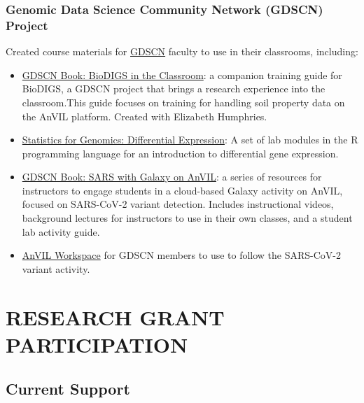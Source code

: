 \documentclass{cv}
\begin{document}
\subsubsection*{Genomic Data Science Community Network (GDSCN) Project}

Created course materials for \href{https://www.gdscn.org/}{GDSCN} faculty to use in their classrooms, including: 

\begin{itemize}

\item \href{https://hutchdatascience.org/GDSCN_BioDIGS_Book/}{GDSCN Book: BioDIGS in the Classroom}: a companion training guide for BioDIGS, a GDSCN project that brings a research experience into the classroom.This guide focuses on training for handling soil property data on the AnVIL platform. Created with Elizabeth Humphries.

\item \href{https://jhudatascience.org/GDSCN_Book_Statistics_for_Genomics_Differential_Expression/}{Statistics for Genomics: Differential Expression}: A set of lab modules in the R programming language for an introduction to differential gene expression.

\item \href{https://jhudatascience.org/GDSCN_Book_SARS_Galaxy_on_AnVIL/}{GDSCN Book: SARS with Galaxy on AnVIL}: a series of resources for instructors to engage students in a cloud-based Galaxy activity on AnVIL, focused on SARS-CoV-2 variant detection. Includes instructional videos, background lectures for instructors to use in their own classes, and a student lab activity guide.

\item \href{https://anvil.terra.bio/#workspaces/gdscn-exercises/SARS-CoV-2-Genome}{AnVIL Workspace} for GDSCN members to use to follow the SARS-CoV-2 variant activity.

\end{itemize}


\section*{RESEARCH GRANT PARTICIPATION}

\subsection*{Current Support}
\end{document}
